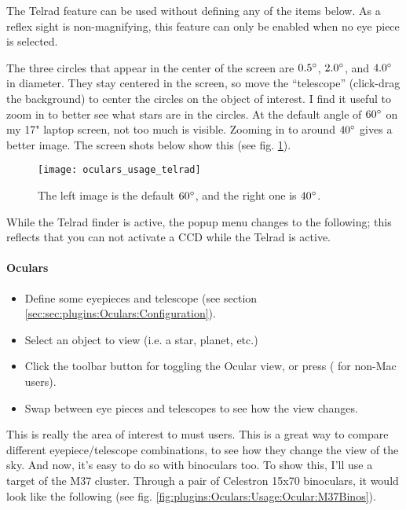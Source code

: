 The Telrad feature can be used without defining any of the items below. As a reflex sight is non-magnifying, this feature can only be enabled when no eye piece is selected.

The three circles that appear in the center of the screen are $0.5\degree$, $2.0\degree$, and $4.0\degree$ in diameter. They stay centered in the screen, so move the ``telescope'' (click-drag the background) to center the circles on the object of interest. I find it useful to zoom in to better see what stars are in the circles. At the default angle of $60\degree$ on my 17" laptop screen, not too much is visible. Zooming in to around $40\degree$ gives a better image. The screen shots below show this (see fig. \ref{fig:plugins:Oculars:Usage:Telrad}).

\begin{figure}[ht]\centering
\texttt{[image: oculars\_usage\_telrad]}
\caption{The left image is the default $60\degree$, and the right one is $40\degree$.}
\label{fig:plugins:Oculars:Usage:Telrad}
\end{figure}

While the Telrad finder is active, the popup menu changes to the following; this reflects that you can not activate a CCD while the Telrad is active.

\paragraph{Oculars}

\begin{itemize}
\item Define some eyepieces and telescope (see section \ref{sec:sec:plugins:Oculars:Configuration}).
\item Select an object to view (i.e. a star, planet, etc.)
\item Click the toolbar button  for toggling the Ocular view, or press  ( for non-Mac users).
\item Swap between eye pieces and telescopes to see how the view changes.
\end{itemize}

This is really the area of interest to must users. This is a great way to compare different eyepiece/telescope combinations, to see how they change the view of the sky. And now, it's easy to do so with binoculars too. To show this, I'll use a target of the M37 cluster. Through a pair of Celestron 15x70 binoculars, it would look like the following (see fig. \ref{fig:plugins:Oculars:Usage:Ocular:M37Binos}).

